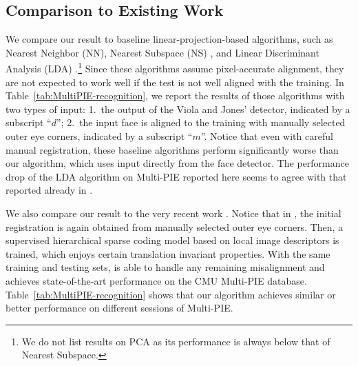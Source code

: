 \documentclass[12pt,journal,draftcls,letterpaper,onecolumn]{IEEEtran}
\begin{document}
\subsection{Comparison to Existing Work}
We compare our result to baseline linear-projection-based
algorithms, such as Nearest Neighbor (NN), Nearest Subspace
(NS) \cite{Lee2005-PAMI}, and Linear Discriminant Analysis
(LDA) \cite{Belhumeur1997-PAMI}.\footnote{We do not list
results on PCA \cite{Turk1991-CVPR} as its performance is
always below that of Nearest Subspace.} Since these algorithms
assume pixel-accurate alignment, they are not expected to work
well if the test is not well aligned with the training. In
Table~\ref{tab:MultiPIE-recognition}, we report the results of
those algorithms with two types of input: 1.\ the output of the
Viola and Jones' detector, indicated by a subscript ``$d$'';
2.\ the input face is aligned to the training with manually
selected outer eye corners, indicated by a subscript ``$m$''.
Notice that even with careful manual registration, these
baseline algorithms perform significantly worse than our
algorithm, which uses input directly from the face detector.
The performance drop of the LDA algorithm on Multi-PIE reported here
seems to agree with that reported already in
\cite{Gross2008-FGR}.

We also compare our result to the very recent work
\cite{Yang2010-CVPR}. Notice that in \cite{Yang2010-CVPR}, the
initial registration is again obtained from manually selected
outer eye corners. Then, a supervised hierarchical sparse
coding model based on local image descriptors is trained, which
enjoys certain translation invariant properties. With the same
training and testing sets, \cite{Yang2010-CVPR} is able to
handle any remaining misalignment and achieves state-of-the-art
performance on the CMU Multi-PIE database.
Table~\ref{tab:MultiPIE-recognition} shows that our algorithm
achieves similar or better performance on different sessions of
Multi-PIE.
\end{document}

